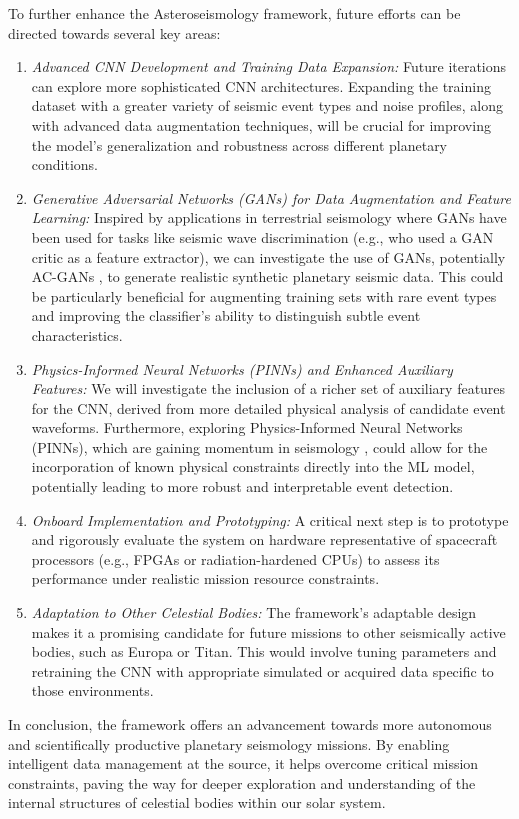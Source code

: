 \documentclass[conference]{IEEEtran}
\begin{document}
To further enhance the Asteroseismology framework, future efforts can be directed towards several key areas:
\begin{enumerate}
\item \textit{Advanced CNN Development and Training Data Expansion:} Future iterations can explore more sophisticated
CNN architectures. Expanding the training dataset with a greater variety of seismic event types and noise profiles,
along with advanced data augmentation techniques, will be crucial for improving the model's generalization and
robustness across different planetary conditions.
\item \textit{Generative Adversarial Networks (GANs) for Data Augmentation and Feature Learning:} Inspired by
applications in terrestrial seismology where GANs have been used for tasks like seismic wave discrimination (e.g.,
\cite{Li2018} who used a GAN critic as a feature extractor), we can investigate the use of GANs, potentially AC-GANs
\cite{Odena2017}, to generate realistic synthetic planetary seismic data. This could be particularly beneficial for
augmenting training sets with rare event types and improving the classifier's ability to distinguish subtle event
characteristics.
\item \textit{Physics-Informed Neural Networks (PINNs) and Enhanced Auxiliary Features:} We will investigate the
inclusion of a richer set of auxiliary features for the CNN, derived from more detailed physical analysis of candidate
event waveforms. Furthermore, exploring Physics-Informed Neural Networks (PINNs), which are gaining momentum in
seismology \cite{MousaviBeroza2022}, could allow for the incorporation of known physical constraints directly into the
ML model, potentially leading to more robust and interpretable event detection.
\item \textit{Onboard Implementation and Prototyping:} A critical next step is to prototype and rigorously evaluate the
system on hardware representative of spacecraft processors (e.g., FPGAs or radiation-hardened CPUs) to
assess its performance under realistic mission resource constraints.
\item \textit{Adaptation to Other Celestial Bodies:} The framework's adaptable design makes it a promising candidate for
future missions to other seismically active bodies, such as Europa or Titan. This would involve tuning parameters and
retraining the CNN with appropriate simulated or acquired data specific to those environments.
\end{enumerate}
In conclusion, the framework offers an advancement towards more autonomous and scientifically productive planetary
seismology missions. By enabling intelligent data management at the source, it helps overcome critical mission
constraints, paving the way for deeper exploration and understanding of the internal structures of celestial bodies
within our solar system.
\end{document}
